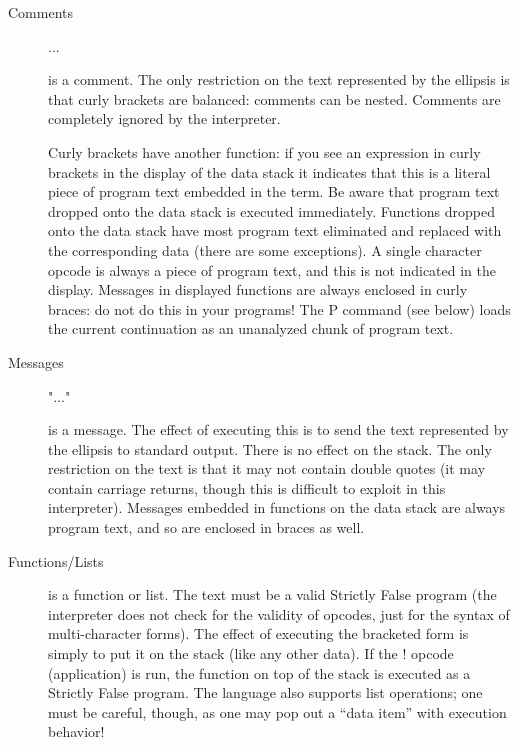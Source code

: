 \documentclass[12pt]{article}
\begin{document}
\begin{description}

\item[Comments]  \begin{verb} {...} \end{verb} is a comment.  The
only restriction on the text represented by the ellipsis is that curly
brackets are balanced: comments can be nested.  Comments are
completely ignored by the interpreter.

Curly brackets have another function: if you see an expression in curly
brackets in the display of the data stack it indicates that this is a
literal piece of program text embedded in the term.  Be aware that
program text dropped onto the data stack is executed immediately.
Functions dropped onto the data stack have most program text
eliminated and replaced with the corresponding data (there are some
exceptions).  A single character opcode is always a piece of program
text, and this is not indicated in the display.  Messages in displayed
functions are always enclosed in curly braces: do not do this in your
programs!  The P command (see below) loads the current continuation as
an unanalyzed chunk of program text.

\item[Messages]  \begin{verb} "..." \end{verb} is a message.  The effect
of executing this is to send the text represented by the ellipsis to
standard output.  There is no effect on the stack.  The only restriction
on the text is that it may not contain double quotes (it may contain
carriage returns, though this is difficult to exploit in this interpreter).
Messages embedded in functions on the data stack are always program
text, and so are enclosed in braces as well.

\item[Functions/Lists]  \begin{verb} [...] \end{verb} is a function
or list.  The text must be a valid Strictly False program (the
interpreter does not check for the validity of opcodes, just for the
syntax of multi-character forms).  The effect of executing the
bracketed form is simply to put it on the stack (like any other data).
If the !  opcode (application) is run, the function on top of the
stack is executed as a Strictly False program.  The language also
supports list operations; one must be careful, though, as one may pop
out a ``data item'' with execution behavior!


\end{description}
\end{document}
